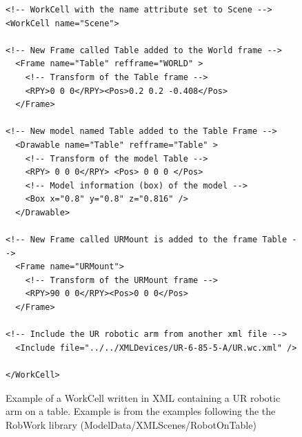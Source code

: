 \begin{figure}[h]
\centering
\lstset{language=XML} 
\begin{lstlisting}[frame=single]
<!-- WorkCell with the name attribute set to Scene -->
<WorkCell name="Scene"> 

<!-- New Frame called Table added to the World frame -->
  <Frame name="Table" refframe="WORLD" >
	<!-- Transform of the Table frame -->
    <RPY>0 0 0</RPY><Pos>0.2 0.2 -0.408</Pos> 
  </Frame>
  
<!-- New model named Table added to the Table Frame -->
  <Drawable name="Table" refframe="Table" >
	<!-- Transform of the model Table -->
    <RPY> 0 0 0</RPY> <Pos> 0 0 0 </Pos>
	<!-- Model information (box) of the model -->
    <Box x="0.8" y="0.8" z="0.816" />
  </Drawable>

<!-- New Frame called URMount is added to the frame Table -->
  <Frame name="URMount">
	<!-- Transform of the URMount frame -->
    <RPY>90 0 0</RPY><Pos>0 0 0</Pos> 
  </Frame>
  
<!-- Include the UR robotic arm from another xml file -->
  <Include file="../../XMLDevices/UR-6-85-5-A/UR.wc.xml" />	

</WorkCell>			 
\end{lstlisting}
\caption{Example of a WorkCell written in XML containing a UR robotic arm on a table. Example is from the examples following the the RobWork library (ModelData/XMLScenes/RobotOnTable)}
\label{fig:XMLCodeExample} 	
\end{figure}

